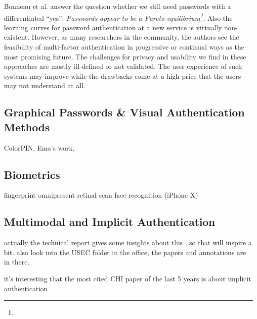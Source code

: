 Bonneau et al. answer the question whether we still need passwords with a differentiated ``yes'': \textit{Passwords appear to be a Pareto equilibrium\footnote{}}. Also the learning curves for password authentication at a new service is virtually non-existent. However, as many researchers in the community, the authors see the feasibility of multi-factor authentication in progressive or continual ways as the most promising future. The challenges for privacy and usability we find in these approaches are mostly ill-defined or not validated. The user experience of such systems may improve while the drawbacks come at a high price that the users may not understand at all. 

	\subsection{Graphical Passwords \& Visual Authentication Methods}
ColorPIN, Ema's work, \cite{Renaud2009VisualSnakeOil} 

	\subsection{Biometrics}
	
	\cite{Jakobsson2014HowToWearYourPW,DeLuca2012TouchMeOnce,Peisert2013PriciplesAuthentication,Rybnicek2014RoadmapContinuousAuth}
	

	fingerprint omnipresent 
	retinal scan
	face recognition (iPhone X)
	
	\subsection{Multimodal and Implicit Authentication}
	
	actually the technical report gives some insights about this \cite{Stockinger2011ImplicitAuthentication}, so that will inspire a bit.
	also look into the USEC folder in the office, the papers and annotations are in there.
	
		it's interesting that the most cited CHI paper of the last 5 years is about implicit authentication \cite{DeLuca2012TouchMeOnce}
	
